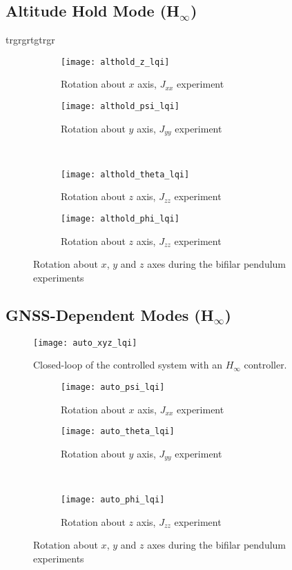 \subsection{Altitude Hold Mode (H$_\infty$)}
trgrgrtgtrgr
\begin{figure}[H]
\begin{subfigure}{.5\linewidth}
\centering
\texttt{[image: althold\_z\_lqi]}
\caption{Rotation about $x$ axis, $J_{xx}$ experiment}
\label{fig:althold_z_lqi2}
\end{subfigure}%
\begin{subfigure}{.5\linewidth}
\centering
\texttt{[image: althold\_psi\_lqi]}
\caption{Rotation about $y$ axis, $J_{yy}$ experiment}
\label{fig:althold_psi_lqi2}
\end{subfigure}\\[1ex]
\begin{subfigure}{0.5\linewidth}
\centering
\texttt{[image: althold\_theta\_lqi]}
\caption{Rotation about $z$ axis, $J_{zz}$ experiment}
\label{fig:althold_theta_lqi2}
\end{subfigure}
\begin{subfigure}{0.5\linewidth}
\centering
\texttt{[image: althold\_phi\_lqi]}
\caption{Rotation about $z$ axis, $J_{zz}$ experiment}
\label{fig:althold_phi_lqi2}
\end{subfigure}
\caption{Rotation about $x$, $y$ and $z$ axes during the bifilar pendulum experiments}
\label{fig:althold_lqi2}
\end{figure}

\subsection{GNSS-Dependent Modes (H$_\infty$)}
\begin{figure}[h]
	\begin{center}
	\texttt{[image: auto\_xyz\_lqi]}
	\caption{Closed-loop of the controlled system with an $H_{\infty}$ controller.}
	\label{fig:auto_xyz_lqi2}
	\end{center}
	\end{figure}
	
\begin{figure}[H]
\begin{subfigure}{.5\linewidth}
\centering
\texttt{[image: auto\_psi\_lqi]}
\caption{Rotation about $x$ axis, $J_{xx}$ experiment}
\label{fig:auto_psi_lqi2}
\end{subfigure}%
\begin{subfigure}{.5\linewidth}
\centering
\texttt{[image: auto\_theta\_lqi]}
\caption{Rotation about $y$ axis, $J_{yy}$ experiment}
\label{fig:auto_theta_lqi2}
\end{subfigure}\\[1ex]
\begin{subfigure}{\linewidth}
\centering
\texttt{[image: auto\_phi\_lqi]}
\caption{Rotation about $z$ axis, $J_{zz}$ experiment}
\label{fig:auto_psi_lqi2}
\end{subfigure}
\caption{Rotation about $x$, $y$ and $z$ axes during the bifilar pendulum experiments}
\label{fig:auto_lqi2}
\end{figure}

